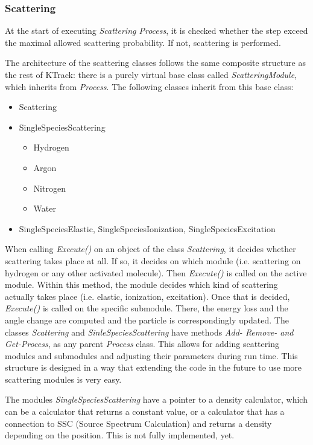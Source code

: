     \subsubsection*{Scattering}
    At the start of executing \textit{Scattering Process}, it is checked whether the step exceed the maximal allowed scattering probability. If not, scattering is performed. 
    
    The  architecture of the scattering classes follows the same composite structure as the rest of KTrack: there is a purely virtual base class called \textit{ScatteringModule}, which inherits from \textit{Process}. The following classes inherit from this base class:
    \begin{itemize}
        \item Scattering
        \item SingleSpeciesScattering 
	\begin{itemize}
		\item Hydrogen
		\item Argon
		\item Nitrogen
		\item Water
	\end{itemize}
        \item SingleSpeciesElastic, SingleSpeciesIonization, SingleSpeciesExcitation
    \end{itemize}
    When calling \textit{Execute()} on an object of the class \textit{Scattering}, it decides whether scattering takes place at all. If so, it decides on which module (i.e. scattering on hydrogen or any other activated molecule). Then \textit{Execute()} is called on the active module. Within this method, the module decides which kind of scattering actually takes place (i.e. elastic, ionization, excitation). Once that is decided, \textit{Execute()} is called on the specific submodule. There, the energy loss and the angle change are computed and the particle is correspondingly updated. The classes \textit{Scattering} and \textit{SinleSpeciesScattering} have methods \textit{Add- Remove- and Get-Process}, as any parent \textit{Process} class. This allows for adding scattering modules and submodules and adjusting their parameters during run time. This structure is designed in a way that extending the code in the future to use more scattering modules is very easy.
    
    The modules \textit{SingleSpeciesScattering} have a pointer to a density calculator, which can be a calculator that returns a constant value, or a calculator that has a connection to SSC (Source Spectrum Calculation) and returns a density depending on the position. This is not fully implemented, yet.
    

